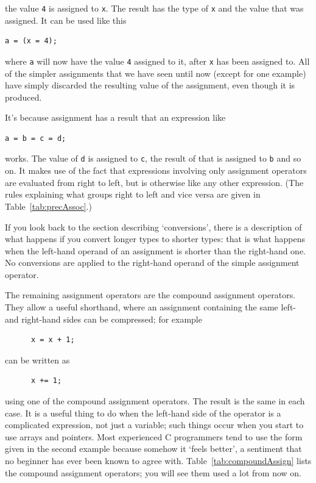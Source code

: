     the value \texttt{4} is assigned to \texttt{x}. The
     result has the type of \texttt{x} and the value that was
     assigned. It can be used like this


    \begin{Verbatim}
a = (x = 4);
\end{Verbatim}

    where \texttt{a} will now have the value \texttt{4}
     assigned to it, after \texttt{x} has been assigned to. All of
     the simpler assignments that we have seen until now (except for one
     example) have simply discarded the resulting value of the assignment,
     even though it is produced.


    It's because assignment has a result that an expression like


    \begin{Verbatim}
a = b = c = d;
\end{Verbatim}

    works. The value of \texttt{d} is assigned
     to \texttt{c}, the result of that is assigned
     to \texttt{b} and so on. It makes use of the fact that
     expressions involving only assignment operators are evaluated from right
     to left, but is otherwise like any other expression. (The rules
     explaining what groups right to left and vice versa are given in
     Table~\ref{tab:precAssoc}.)


    If you look back to the section describing `conversions', there
     is a description of what happens if you convert longer types to shorter
     types: that is what happens when the left-hand operand of an assignment
     is shorter than the right-hand one. No conversions are applied to the
     right-hand operand of the simple assignment operator.


    The remaining assignment operators are the compound assignment
     operators. They allow a useful shorthand, where an assignment containing
     the same left- and right-hand sides can be compressed; for example


    \begin{Verbatim}
      x = x + 1;
    \end{Verbatim}

    can be written as


    \begin{Verbatim}
      x += 1;
    \end{Verbatim}

    using one of the compound assignment operators. The result is the same
     in each case. It is a useful thing to do when the left-hand side of the
     operator is a complicated expression, not just a variable; such things
     occur when you start to use arrays and pointers. Most experienced C
     programmers tend to use the form given in the second example because
     somehow it `feels better', a sentiment that no beginner has ever
     been known to agree with. Table~\ref{tab:compoundAssign} lists the compound
     assignment operators; you will see them used a lot from now on.



